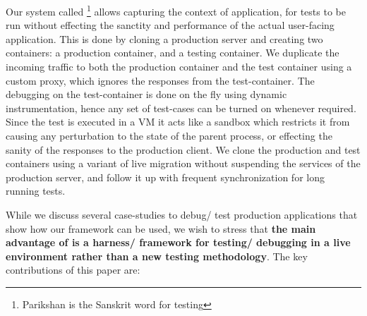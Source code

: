  Our system called \parikshan\footnote{Parikshan is the Sanskrit word for testing} allows capturing the context of application, 
for tests to be run without effecting the sanctity and performance of the actual user-facing application. 
This is done by cloning a production server and creating two containers: a production container, and a testing container. 
We duplicate the incoming traffic to both the production container and the test container using a custom proxy, which ignores the responses from the test-container. 
The debugging on the test-container is done on the fly using dynamic instrumentation, hence any set of test-cases can be turned on whenever required. 
Since the test is executed in a VM it acts like a sandbox which restricts it from causing any perturbation to the state of the parent process, or effecting the sanity of the responses to the production client. 
We clone the production and test containers using a variant of live migration without suspending the services of the production server, and follow it up with frequent synchronization for long running tests.

While we discuss several case-studies to debug/ test production applications that show how our framework can be used, we wish to stress that \textbf{the main advantage of \parikshan is a harness/ framework for testing/ debugging in a live environment rather than a new testing methodology}. 
The key contributions of this paper are:

